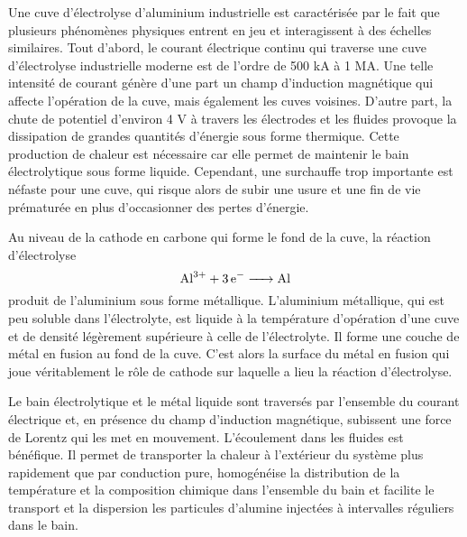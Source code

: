 Une cuve d'électrolyse d'aluminium industrielle est caractérisée par
le fait que plusieurs phénomènes physiques entrent en jeu et
interagissent à des échelles similaires. Tout d'abord, le courant
électrique continu qui traverse une cuve d'électrolyse industrielle
moderne est de l'ordre de \num{500} \si{\kilo\ampere} à \num{1}
\si{\mega\ampere}. Une telle intensité de courant génère d'une part un
champ d'induction magnétique qui affecte l'opération de la cuve, mais
également les cuves voisines. D'autre part, la chute de
potentiel d'environ \num{4} \si{\volt} à travers les électrodes et les
fluides \cite{Haupin1995} provoque la dissipation de grandes quantités
d'énergie sous forme thermique. Cette production de chaleur est
nécessaire car elle permet de maintenir le bain électrolytique sous
forme liquide. Cependant, une surchauffe trop importante est néfaste
pour une cuve, qui risque alors de subir une usure et une fin de vie
prématurée en plus d'occasionner des pertes d'énergie.

Au niveau de la cathode en carbone qui forme le fond de la cuve, la
réaction d'électrolyse
\begin{equation}
\cee{Al^{3+} + 3e^- -> Al}
\end{equation}
produit de l'aluminium sous forme métallique. L'aluminium métallique,
qui est peu soluble dans l'électrolyte, est liquide à la température
d'opération d'une cuve et de densité légèrement supérieure à celle de
l'électrolyte. Il forme une couche de métal en fusion au fond de la
cuve. C'est alors la surface du métal en fusion qui joue véritablement
le rôle de cathode sur laquelle a lieu la réaction d'électrolyse.

Le bain électrolytique et le métal liquide sont traversés par
l'ensemble du courant électrique et, en présence du champ d'induction
magnétique, subissent une force de Lorentz qui les met en
mouvement. L'écoulement dans les fluides est bénéfique. Il permet de
transporter la chaleur à l'extérieur du système plus rapidement que
par conduction pure, homogénéise la distribution de la température et
la composition chimique dans l'ensemble du bain et facilite le
transport et la dispersion les particules d'alumine injectées à
intervalles réguliers dans le bain.

